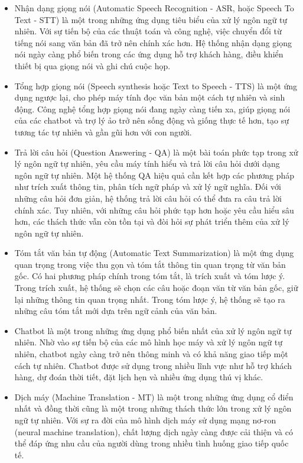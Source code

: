 \begin{itemize}
    \item Nhận dạng giọng nói (Automatic Speech Recognition - ASR, hoặc Speech To Text - STT) là một trong những ứng dụng tiêu biểu của xử lý ngôn ngữ tự nhiên. Với sự tiến bộ của các thuật toán và công nghệ, việc chuyển đổi từ tiếng nói sang văn bản đã trở nên chính xác hơn. Hệ thống nhận dạng giọng nói ngày càng phổ biến trong các ứng dụng hỗ trợ khách hàng, điều khiển thiết bị qua giọng nói và ghi chú cuộc họp.
    \item Tổng hợp giọng nói (Speech synthesis hoặc Text to Speech - TTS) là một ứng dụng ngược lại, cho phép máy tính đọc văn bản một cách tự nhiên và sinh động. Công nghệ tổng hợp giọng nói đang ngày càng tiến xa, giúp giọng nói của các chatbot và trợ lý ảo trở nên sống động và giống thực tế hơn, tạo sự tương tác tự nhiên và gần gũi hơn với con người.
    \item Trả lời câu hỏi (Question Answering - QA) là một bài toán phức tạp trong xử lý ngôn ngữ tự nhiên, yêu cầu máy tính hiểu và trả lời câu hỏi dưới dạng ngôn ngữ tự nhiên. Một hệ thống QA hiệu quả cần kết hợp các phương pháp như trích xuất thông tin, phân tích ngữ pháp và xử lý ngữ nghĩa. Đối với những câu hỏi đơn giản, hệ thống trả lời câu hỏi có thể đưa ra câu trả lời chính xác. Tuy nhiên, với những câu hỏi phức tạp hơn hoặc yêu cầu hiểu sâu hơn, các thách thức vẫn còn tồn tại và đòi hỏi sự phát triển thêm của xử lý ngôn ngữ tự nhiên.
    \item Tóm tắt văn bản tự động (Automatic Text Summarization) là một ứng dụng quan trọng trong việc thu gọn và tóm tắt thông tin quan trọng từ văn bản gốc. Có hai phương pháp chính trong tóm tắt, là trích xuất và tóm lược ý. Trong trích xuất, hệ thống sẽ chọn các câu hoặc đoạn văn từ văn bản gốc, giữ lại những thông tin quan trọng nhất. Trong tóm lược ý, hệ thống sẽ tạo ra những câu tóm tắt mới dựa trên ngữ cảnh của văn bản.
    \item Chatbot là một trong những ứng dụng phổ biến nhất của xử lý ngôn ngữ tự nhiên. Nhờ vào sự tiến bộ của các mô hình học máy và xử lý ngôn ngữ tự nhiên, chatbot ngày càng trở nên thông minh và có khả năng giao tiếp một cách tự nhiên. Chatbot được sử dụng trong nhiều lĩnh vực như hỗ trợ khách hàng, dự đoán thời tiết, đặt lịch hẹn và nhiều ứng dụng thú vị khác.
    \item Dịch máy (Machine Translation - MT) là một trong những ứng dụng cổ điển nhất và đồng thời cũng là một trong những thách thức lớn trong xử lý ngôn ngữ tự nhiên. Với sự ra đời của mô hình dịch máy sử dụng mạng nơ-ron (neural machine translation), chất lượng dịch ngày càng được cải thiện và có thể đáp ứng nhu cầu của người dùng trong nhiều tình huống giao tiếp quốc tế.

\end{itemize}
